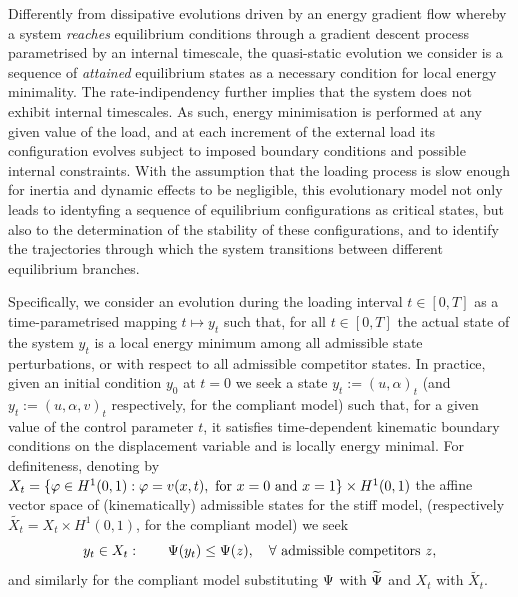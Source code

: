 Differently from dissipative evolutions driven by an energy gradient flow whereby a system \emph{reaches} equilibrium conditions through a gradient descent process parametrised by an internal timescale, the quasi-static evolution we consider is a sequence of \emph{attained} equilibrium states as a necessary condition for local energy minimality. 
The rate-indipendency further implies that the system does not exhibit internal timescales.
As such, energy minimisation is performed at any given value of the load, and at each increment of the external load its configuration evolves subject to imposed boundary conditions and possible internal constraints.
With the assumption that the loading process is slow enough for inertia and dynamic effects to be negligible, this evolutionary model not only leads to identyfing a sequence of equilibrium configurations as critical states, but also to the determination of the stability of these configurations, and to identify the trajectories through which the system transitions between different equilibrium branches.
% 

Specifically, we consider an evolution during the loading interval $t\in [0, T]$ as a time-parametrised mapping $t\mapsto y_t$  such that, for all $t\in [0, T]$ the actual state of the system $y_t$ is a local energy minimum among all admissible state perturbations, or with respect to all admissible competitor states. %
In practice, given an initial condition $y_0$ at $t=0$ we seek a state $y_t:=(u, \alpha)_t$ (and $y_t:=(u, \alpha, v)_t$ respectively, for the compliant model) such that, for a given value of the control parameter $t$, it satisfies time-dependent kinematic boundary conditions on the displacement variable and is locally energy minimal. 
For definiteness, denoting by $X_t = \{\varphi\in H^1(0, 1):\varphi=v(x, t),\text{ for } x=0\text{ and } x=1\}\times H^1(0,1)$ the affine vector space of (kinematically) admissible states for the stiff model, (respectively $\widetilde{X_t} = X_t\times H^1(0, 1)$, for the compliant model) 
we seek 
\begin{equation}
    \label{eq:variational_global_ineq}
    y_t\in X_t: \qquad \Psi(y_t) \leq \Psi(z),\quad \forall \text{ admissible competitors } z,
\end{equation}
and similarly for the compliant model substituting $\Psi$ with $\widetilde\Psi$ and $X_t$ with $\widetilde{X_t}$.
